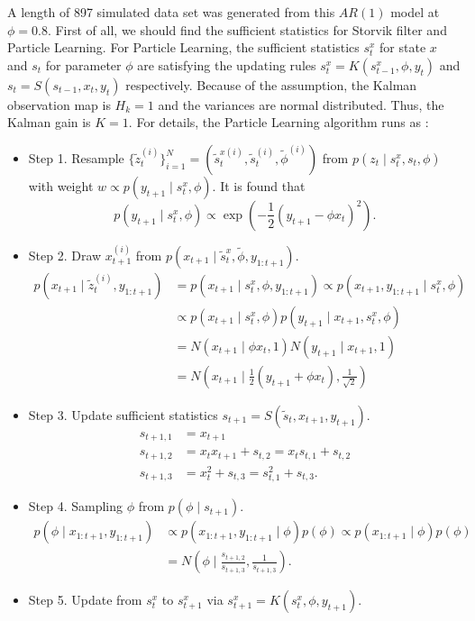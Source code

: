A length of 897 simulated data set was generated from this $\mathit{AR}(1)$ model at $\phi=0.8$. First of all, we should find the sufficient statistics for Storvik filter and Particle Learning. For Particle Learning, the sufficient statistics $s_t^x$ for state $x$ and $s_t$ for parameter $\phi$ are satisfying the updating rules $s_t^x=K(s_{t-1}^x,\phi ,y_t)$ and $s_t=S(s_{t-1},x_t,y_t)$ respectively. Because of the assumption, the Kalman observation map is $H_k=1$ and the variances are normal distributed. Thus, the Kalman gain is $K=1$. For details, the Particle Learning algorithm runs as : 
\begin{itemize}
\item Step 1. Resample $\{\tilde{z}_t^{(i)}\}_{i=1}^N=(\tilde{s}_t^{x(i)},\tilde{s}_t^{(i)},\tilde{\phi }^{(i)})$ from $p(z_t\mid s_t^x,s_t,\phi )$ with weight $w\propto p(y_{t+1}\mid s_{t}^x,\phi )$. It is found that \begin{equation*}
p(y_{t+1}\mid s_{t}^x,\phi ) \propto \exp \left(-\frac{1}{2}(y_{t+1}-\phi  x_{t})^2 \right).
\end{equation*}
\item Step 2. Draw $x_{t+1}^{(i)}$ from $p(x_{t+1}\mid \tilde{s}_t^x,\tilde{\phi },y_{1:t+1})$. 
\begin{align*}
p(x_{t+1}\mid \tilde{z}_t^{(i)},y_{1:t+1}) &= p(x_{t+1}\mid s_t^x,\phi,y_{1:t+1}) \propto p(x_{t+1},y_{1:t+1}\mid s_t^x,\phi)\\
& \propto p(x_{t+1}\mid s_t^x,\phi)p(y_{t+1}\mid x_{t+1},s_t^x,\phi) \\
&= N(x_{t+1}\mid \phi x_t,1)N(y_{t+1}\mid x_{t+1},1)\\
&= N\left(x_{t+1}\mid \frac{1}{2}(y_{t+1}+\phi x_t),\frac{1}{\sqrt{2}}\right)
\end{align*}
\item Step 3. Update sufficient statistics  $s_{t+1}=S(\tilde{s}_{t}, x_{t+1},y_{t+1})$.
\begin{align*}
s_{t+1,1} &= x_{t+1} \\
s_{t+1,2} &= x_tx_{t+1}+s_{t,2} = x_ts_{t,1}+s_{t,2} \\
s_{t+1,3} &= x_{t}^2 + s_{t,3} = s_{t,1}^2 + s_{t,3} .
\end{align*}
\item Step 4. Sampling $\phi $ from $p(\phi  \mid  s_{t+1})$.
\begin{align*}
p(\phi  \mid  x_{1:t+1},y_{1:t+1}) & \propto p(x_{1:t+1},y_{1:t+1}\mid \phi )p(\phi )\propto p(x_{1:t+1}\mid \phi )p(\phi )\\
&= N\left( \phi \mid  \frac{s_{t+1,2}}{s_{t+1,3}},\frac{1}{s_{t+1,3}} \right).
\end{align*}
\item Step 5. Update from $s_{t}^x$ to $s_{t+1}^x$ via $s_{t+1}^x = K(s_{t}^x,\phi ,y_{t+1})$.
\end{itemize}


